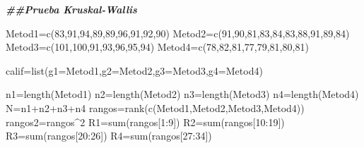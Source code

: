 \documentclass[
  a4paper,
  oneside,
  openany]{book}
\newenvironment{Shaded}{\begin{snugshade}}{\end{snugshade}}
\newcommand{\AttributeTok}[1]{\textcolor[rgb]{0.77,0.63,0.00}{#1}}
\newcommand{\DecValTok}[1]{\textcolor[rgb]{0.00,0.00,0.81}{#1}}
\newcommand{\DocumentationTok}[1]{\textcolor[rgb]{0.56,0.35,0.01}{\textbf{\textit{#1}}}}
\newcommand{\FunctionTok}[1]{\textcolor[rgb]{0.00,0.00,0.00}{#1}}
\newcommand{\NormalTok}[1]{#1}
\newcommand{\OtherTok}[1]{\textcolor[rgb]{0.56,0.35,0.01}{#1}}
\newcommand{\SpecialCharTok}[1]{\textcolor[rgb]{0.00,0.00,0.00}{#1}}
\begin{document}
\begin{Shaded}
\begin{Highlighting}[]
\DocumentationTok{\#\#Prueba Kruskal{-}Wallis}

\NormalTok{Metod1}\OtherTok{=}\FunctionTok{c}\NormalTok{(}\DecValTok{83}\NormalTok{,}\DecValTok{91}\NormalTok{,}\DecValTok{94}\NormalTok{,}\DecValTok{89}\NormalTok{,}\DecValTok{89}\NormalTok{,}\DecValTok{96}\NormalTok{,}\DecValTok{91}\NormalTok{,}\DecValTok{92}\NormalTok{,}\DecValTok{90}\NormalTok{)    }
\NormalTok{Metod2}\OtherTok{=}\FunctionTok{c}\NormalTok{(}\DecValTok{91}\NormalTok{,}\DecValTok{90}\NormalTok{,}\DecValTok{81}\NormalTok{,}\DecValTok{83}\NormalTok{,}\DecValTok{84}\NormalTok{,}\DecValTok{83}\NormalTok{,}\DecValTok{88}\NormalTok{,}\DecValTok{91}\NormalTok{,}\DecValTok{89}\NormalTok{,}\DecValTok{84}\NormalTok{)}
\NormalTok{Metod3}\OtherTok{=}\FunctionTok{c}\NormalTok{(}\DecValTok{101}\NormalTok{,}\DecValTok{100}\NormalTok{,}\DecValTok{91}\NormalTok{,}\DecValTok{93}\NormalTok{,}\DecValTok{96}\NormalTok{,}\DecValTok{95}\NormalTok{,}\DecValTok{94}\NormalTok{)        }
\NormalTok{Metod4}\OtherTok{=}\FunctionTok{c}\NormalTok{(}\DecValTok{78}\NormalTok{,}\DecValTok{82}\NormalTok{,}\DecValTok{81}\NormalTok{,}\DecValTok{77}\NormalTok{,}\DecValTok{79}\NormalTok{,}\DecValTok{81}\NormalTok{,}\DecValTok{80}\NormalTok{,}\DecValTok{81}\NormalTok{)}

\NormalTok{calif}\OtherTok{=}\FunctionTok{list}\NormalTok{(}\AttributeTok{g1=}\NormalTok{Metod1,}\AttributeTok{g2=}\NormalTok{Metod2,}\AttributeTok{g3=}\NormalTok{Metod3,}\AttributeTok{g4=}\NormalTok{Metod4)}

\NormalTok{n1}\OtherTok{=}\FunctionTok{length}\NormalTok{(Metod1)}
\NormalTok{n2}\OtherTok{=}\FunctionTok{length}\NormalTok{(Metod2)}
\NormalTok{n3}\OtherTok{=}\FunctionTok{length}\NormalTok{(Metod3)}
\NormalTok{n4}\OtherTok{=}\FunctionTok{length}\NormalTok{(Metod4)}
\NormalTok{N}\OtherTok{=}\NormalTok{n1}\SpecialCharTok{+}\NormalTok{n2}\SpecialCharTok{+}\NormalTok{n3}\SpecialCharTok{+}\NormalTok{n4}
\NormalTok{rangos}\OtherTok{=}\FunctionTok{rank}\NormalTok{(}\FunctionTok{c}\NormalTok{(Metod1,Metod2,Metod3,Metod4))}
\NormalTok{rangos2}\OtherTok{=}\NormalTok{rangos}\SpecialCharTok{\^{}}\DecValTok{2}
\NormalTok{R1}\OtherTok{=}\FunctionTok{sum}\NormalTok{(rangos[}\DecValTok{1}\SpecialCharTok{:}\DecValTok{9}\NormalTok{])}
\NormalTok{R2}\OtherTok{=}\FunctionTok{sum}\NormalTok{(rangos[}\DecValTok{10}\SpecialCharTok{:}\DecValTok{19}\NormalTok{])}
\NormalTok{R3}\OtherTok{=}\FunctionTok{sum}\NormalTok{(rangos[}\DecValTok{20}\SpecialCharTok{:}\DecValTok{26}\NormalTok{])}
\NormalTok{R4}\OtherTok{=}\FunctionTok{sum}\NormalTok{(rangos[}\DecValTok{27}\SpecialCharTok{:}\DecValTok{34}\NormalTok{])}


\end{Highlighting}
\end{Shaded}
\end{document}
